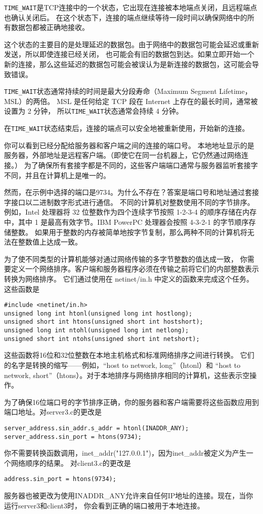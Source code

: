 \documentclass{ctexart}
\begin{document}
\texttt{TIME\_WAIT}是TCP连接中的一个状态，它出现在连接被本地端点关闭，且远程端点也确认关闭后。
在这个状态下，连接的端点继续等待一段时间以确保网络中的所有数据包都被正确地接收。  
  
这个状态的主要目的是处理延迟的数据包。由于网络中的数据包可能会延迟或重新发送，所以即使连接已经关闭，
也可能会有旧的数据包到达。如果立即开始一个新的连接，那么这些延迟的数据包可能会被误认为是新连接的数据包，这可能会导致错误。  
  
\texttt{TIME\_WAIT}状态通常持续的时间是最大分段寿命（Maximum Segment Lifetime，MSL）的两倍。
MSL 是任何给定 TCP 段在 Internet 上存在的最长时间，通常被设置为 2 分钟，
所以\texttt{TIME\_WAIT}状态通常会持续 4 分钟。  
  
在\texttt{TIME\_WAIT}状态结束后，连接的端点可以安全地被重新使用，开始新的连接。  

你可以看到已经分配给服务器和客户端之间的连接的端口号。
本地地址显示的是服务器，外部地址是远程客户端。（即使它在同一台机器上，它仍然通过网络连接。）
为了确保所有套接字都是不同的，这些客户端端口通常与服务器监听套接字不同，并且在计算机上是唯一的。  

然而，在示例中选择的端口是9734。为什么不存在？答案是端口号和地址通过套接字接口以二进制数字形式进行通信。
不同的计算机对整数使用不同的字节排序。例如，Intel 处理器将 32 位整数作为四个连续字节按照 1-2-3-4 
的顺序存储在内存中，其中 1 是最高有效字节。IBM PowerPC 处理器会按照 4-3-2-1 的字节顺序存储整数。
如果用于整数的内存被简单地按字节复制，那么两种不同的计算机将无法在整数值上达成一致。  
  
为了使不同类型的计算机能够对通过网络传输的多字节整数的值达成一致，
你需要定义一个网络排序。客户端和服务器程序必须在传输之前将它们的内部整数表示转换为网络排序。
它们通过使用在 netinet/in.h 中定义的函数来完成这个任务。这些函数是  
\begin{verbatim}  
#include <netinet/in.h>  
unsigned long int htonl(unsigned long int hostlong);  
unsigned short int htons(unsigned short int hostshort);  
unsigned long int ntohl(unsigned long int netlong);  
unsigned short int ntohs(unsigned short int netshort);  
\end{verbatim}  

这些函数将16位和32位整数在本地主机格式和标准网络排序之间进行转换。
它们的名字是转换的缩写——例如，``host to network, long''（htonl）和
``host to network, short''（htons）。对于本地排序与网络排序相同的计算机，这些表示空操作。  

为了确保16位端口号的字节排序正确，你的服务器和客户端需要将这些函数应用到端口地址。对server3.c的更改是  
\begin{verbatim}  
server_address.sin_addr.s_addr = htonl(INADDR_ANY);  
server_address.sin_port = htons(9734);  
\end{verbatim}  
你不需要转换函数调用，inet\_addr("127.0.0.1")，因为inet\_addr被定义为产生一个网络顺序的结果。
对client3.c的更改是  
\begin{verbatim}  
address.sin_port = htons(9734);  
\end{verbatim}  
服务器也被更改为使用INADDR\_ANY允许来自任何IP地址的连接。现在，当你运行server3和client3时，
你会看到正确的端口被用于本地连接。  
\end{document}
